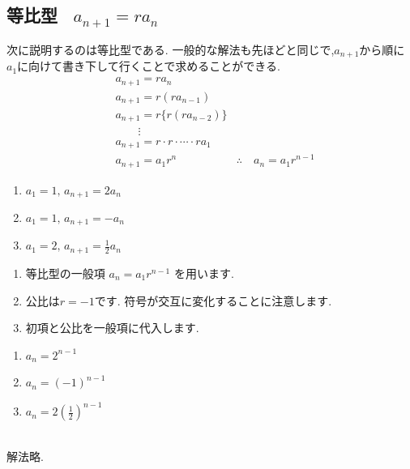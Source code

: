 
  \subsection{\texorpdfstring{等比型 \, $a_{n+1}=ra_n$}{等比型}}\label{節：等比型}
    次に説明するのは等比型である.
    一般的な解法も先ほどと同じで,$a_{n+1}$から順に$a_1$に向けて書き下して行くことで求めることができる.
    \begin{align*}
      &a_{n+1}=ra_n\\
      &a_{n+1}=r(ra_{n-1})\\
      &a_{n+1}=r\{r(ra_{n-2})\}\\
      &\qquad \vdots\\
      &a_{n+1}=r\cdot r \cdot \cdots \cdot ra_1\\
      &a_{n+1}=a_1r^n
      &\therefore \quad a_n=a_1r^{n-1}
    \end{align*}

    \noindent {}
    \begin{enumerate}[label=(\arabic*),parsep=3pt,format=\bookitemlink{example-geometric-1}{problem}{answer}]
      \item $\displaystyle a_1=1,\, a_{n+1}=2a_n$
      \item $\displaystyle a_1=1,\, a_{n+1}=-a_n$
      \item $\displaystyle a_1=2,\, a_{n+1}=\frac{1}{2}a_n$
    \end{enumerate}

    \noindent{}
    \begin{enumerate}[label=(\arabic*),parsep=3pt,format=\bookitemlink{example-geometric-1}{hint}{problem}]
      \item 等比型の一般項
            $\displaystyle a_n=a_1r^{n-1}$
            を用います.
      \item 公比は$r=-1$です.
            符号が交互に変化することに注意します.
      \item 初項と公比を一般項に代入します.
    \end{enumerate}

    \noindent{}
    \begin{enumerate}[label=(\arabic*),parsep=3pt,format=\bookitemlink{example-geometric-1}{answer}{problem}]
      \item $\displaystyle a_n=2^{n-1}$
      \item $\displaystyle a_n=(-1)^{n-1}$
      \item $\displaystyle a_n=2\left(\frac12\right)^{n-1}$
    \end{enumerate}

    \noindent{}\\
    解法略.


